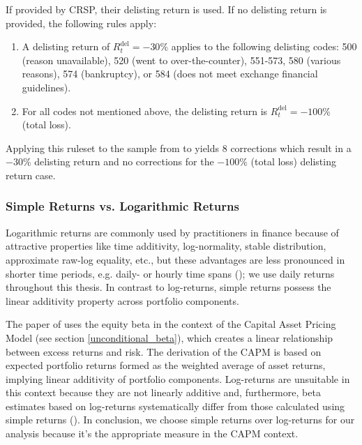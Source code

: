 \documentclass[11pt,a4paper]{article}
\begin{document}
If provided by CRSP, their delisting return is used. If no delisting return is provided, the following rules apply:
\begin{enumerate}
\item A delisting return of $R_t^\textrm{del} = -30\%$ applies to the following delisting codes: 500 (reason unavailable), 520 (went to over-the-counter), 551-573, 580 (various reasons), 574 (bankruptcy), or 584 (does not meet exchange financial guidelines).
\item For all codes not mentioned above, the delisting return is $R_t^\textrm{del} = -100\%$ (total loss).
\end{enumerate}

Applying this ruleset to the  \indexName{} sample from \periodFrom{} to \periodTo{} yields $8$ corrections which result in a $-30\%$ delisting return and no corrections for the $-100\%$ (total loss) delisting return case.



\subsubsection{Simple Returns vs. Logarithmic Returns}

Logarithmic returns are commonly used by practitioners in finance because of attractive properties like time additivity, log-normality, stable distribution, approximate raw-log equality, etc., but these advantages are less pronounced in shorter time periods, e.g. daily- or hourly time spans (); we use daily returns throughout this thesis. In contrast to log-returns, simple returns possess the linear additivity property across portfolio components.

The paper of  uses the equity beta in the context of the Capital Asset Pricing Model (see section \ref{unconditional_beta}), which creates a linear relationship between excess returns and risk. The derivation of the CAPM is based on expected portfolio returns formed as the weighted average of asset returns, implying linear additivity of portfolio components. Log-returns are unsuitable in this context because they are not linearly additive and, furthermore, beta estimates based on log-returns systematically differ from those calculated using simple returns (). In conclusion, we choose simple returns over log-returns for our analysis because it's the appropriate measure in the CAPM context.
\end{document}
